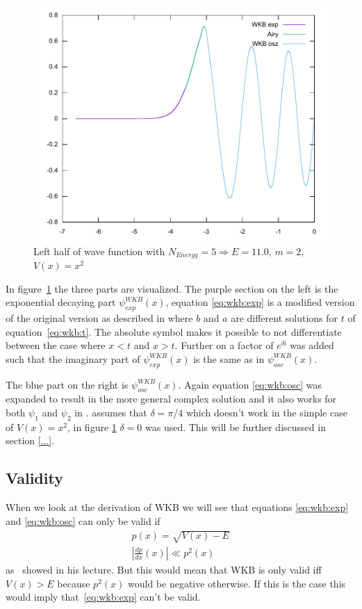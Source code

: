 \documentclass[11pt,DIV=10,final]{scrreprt} %
\newcommand{\mi}{{\text{i}}}
\begin{document}
\begin{figure}[H]\label{fig:wave_parts}
  \centering
  \includegraphics[width=.9\textwidth]{plots/square5half.pdf}
  \caption{Left half of wave function with $N_{Energy} = 5 \Rightarrow E = 11.0$, $m = 2$, $V(x) = x^{2}$}
\end{figure}
In figure~\ref{fig:wave_parts} the three parts are visualized. The purple section on the left is the exponential decaying part $\psi^{WKB}_{exp} (x)$, equation \ref{eq:wkb:exp} is a modified version of the
original version as described in \cite[p. 317, eq. 15.25]{hall2013quantum} where $b$ and $a$ are different solutions for $t$ of equation~\ref{eq:wkb:t}. The absolute symbol makes it possible to not
differentiate between the case where $x < t$ and $x > t$. Further on a factor of $e^{\delta\mi}$ was added such that the imaginary part of $\psi^{WKB}_{exp}(x)$ is the same as in $\psi^{WKB}_{osc}(x)$.

The blue part on the right is $\psi^{WKB}_{osc}(x)$. Again equation \ref{eq:wkb:osc} was expanded to result in the more general complex solution and it also works for both $\psi_{1}$ and $\psi_{2}$ in
\cite[p. 316-317, Claim 15.7]{hall2013quantum}. \cite{hall2013quantum} assumes that $\delta = \pi / 4$ which doesn't work in the simple case of $V(x) = x^{2}$, in figure \ref{fig:wave_parts} $\delta = 0$ was used. This will be further discussed in section \ref{...}.

\subsection{Validity}
When we look at the derivation of WKB we will see that equations \ref{eq:wkb:exp} and \ref{eq:wkb:osc} can only be valid if
\begin{align*}
  p(x) = \sqrt{V(x) - E} \\
  \left|\frac{dp}{dx}(x)\right| \ll p^{2}(x)
\end{align*}
as~\cite{zwiebach2018lecture} showed in his lecture.
But this would mean that WKB is only valid iff $V(x) > E$ because $p^{2}(x)$ would be negative otherwise.
If this is the case this would imply that~\ref{eq:wkb:exp} can't be valid.
\end{document}
